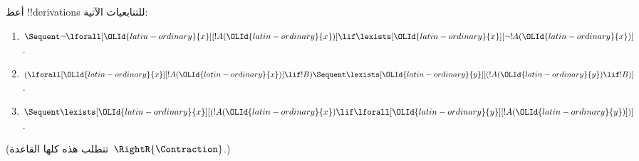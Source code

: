 \documentclass[../../../include/open-logic-section]{subfiles}
\begin{document}
\begin{prob}
أعط !!{derivation}s للتتابعيات الآتية:
\begin{enumerate}
\item $\Sequent \lnot\lforall[\OLId{latin-ordinary}{x}][!A(\OLId{latin-ordinary}{x})] \lif \lexists[\OLId{latin-ordinary}{x}][\lnot!A(\OLId{latin-ordinary}{x})]$.
\item $(\lforall[\OLId{latin-ordinary}{x}][!A(\OLId{latin-ordinary}{x})] \lif !B) \Sequent \lexists[\OLId{latin-ordinary}{y}][(!A(\OLId{latin-ordinary}{y}) \lif !B)]$.
\item $\Sequent \lexists[\OLId{latin-ordinary}{x}][(!A(\OLId{latin-ordinary}{x}) \lif \lforall[\OLId{latin-ordinary}{y}][!A(\OLId{latin-ordinary}{y})])]$.
\end{enumerate}
(تتطلب هذه كلها القاعدة~$\RightR{\Contraction}$.)
\end{prob}
\end{document}
